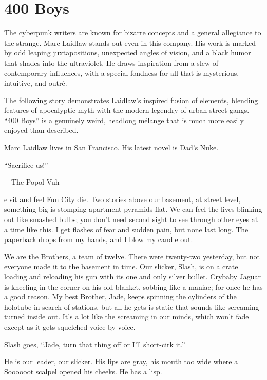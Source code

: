 \chapter{400 Boys}

The cyberpunk writers are known for bizarre concepts and a general allegiance to the strange. Marc Laidlaw stands out even in this company. His work is marked by odd leaping juxtapositions, unexpected angles of vision, and a black humor that shades into the ultraviolet. He draws inspiration from a slew of contemporary influences, with a special fondness for all that is mysterious, intuitive, and outré.

The following story demonstrates Laidlaw's inspired fusion of elements, blending features of apocalyptic myth with the modern legendry of urban street gangs. ``400 Boys'' is a genuinely weird, headlong mélange that is much more easily enjoyed than described.

Marc Laidlaw lives in San Francisco. His latest novel is Dad's Nuke.

\hrulefill

``Sacrifice us!''

—The Popol Vuh
 
e sit and feel Fun City die. Two stories above our basement, at street level, something big is stomping apartment pyramids flat. We can feel the lives blinking out like smashed bulbs; you don't need second sight to see through other eyes at a time like this. I get flashes of fear and sudden pain, but none last long. The paperback drops from my hands, and I blow my candle out.

We are the Brothers, a team of twelve. There were twenty-two yesterday, but not everyone made it to the basement in time. Our slicker, Slash, is on a crate loading and reloading his gun with its one and only silver bullet. Crybaby Jaguar is kneeling in the corner on his old blanket, sobbing like a maniac; for once he has a good reason. My best Brother, Jade, keeps spinning the cylinders of the holotube in search of stations, but all he gets is static that sounds like screaming turned inside out. It's a lot like the screaming in our minds, which won't fade except as it gets squelched voice by voice.

Slash goes, ``Jade, turn that thing off or I'll short-cirk it.''

He is our leader, our slicker. His lips are gray, his mouth too wide where a Soooooot scalpel opened his cheeks. He has a lisp.

